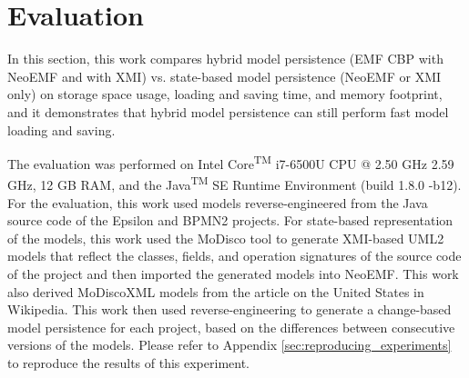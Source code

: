 \section{Evaluation}
\label{sec:evaluation_5}
In this section, this work compares hybrid model persistence (EMF CBP with NeoEMF and with XMI) vs. state-based model persistence (NeoEMF or XMI only) on storage space usage, loading and saving time, and memory footprint, and it demonstrates that hybrid model persistence can still perform fast model loading and saving.

The evaluation was performed on Intel\textsuperscript{\textregistered} Core\textsuperscript{TM} i7-6500U CPU @ 2.50 GHz 2.59 GHz, 12 GB RAM, and the Java\textsuperscript{TM} SE Runtime Environment (build 1.8.0 -b12). For the evaluation, this work used models reverse-engineered from the Java source code of the Epsilon \cite{eclipse2017epsilon,eclipse2018epsilongit} and BPMN2 \cite{eclipse2017bpmn2} projects. For state-based representation of the models, this work used the MoDisco tool \cite{DBLP:journals/infsof/BruneliereCDM14} to generate XMI-based UML2 \cite{eclipse2017uml2} models that reflect the classes, fields, and operation signatures of the source code of the project and then imported the generated models into NeoEMF. This work also derived MoDiscoXML models \cite{eclipse2018modiscoxml} from the article on the United States in Wikipedia\cite{wikipedia2018us}. This work then used reverse-engineering to generate a change-based model persistence for each project, based on the differences between consecutive versions of the models. Please refer to Appendix \ref{sec:reproducing_experiments} to reproduce the results of this experiment.

